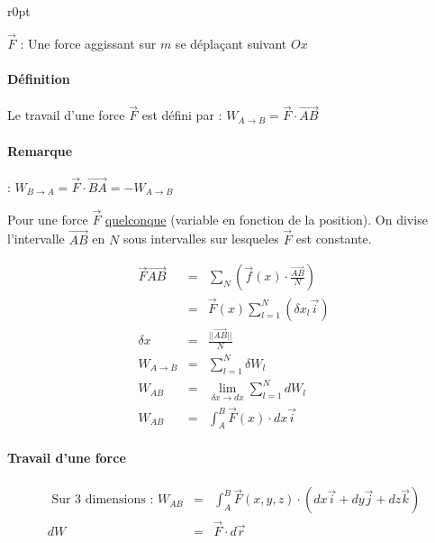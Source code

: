 \begin{wrapfigure}[6]{r}{0pt}
\end{wrapfigure}

$\vec{F}$ : Une force aggissant sur $m$ se déplaçant suivant $Ox$

\paragraph{Définition} Le travail d'une force $\vec{F}$ est défini par : $W_{A \rightarrow B} = \vec{F}\cdot\overrightarrow{AB}$
\paragraph{Remarque} : $W_{B \rightarrow A} = \vec{F}\cdot\overrightarrow{BA} = -W_{A \rightarrow B} $

Pour une force $\vec{F}$ \ul{quelconque} (variable en fonction de la position). On divise l'intervalle $\vec{AB}$ en $N$ sous intervalles sur lesqueles $\vec{F}$ est constante.

\[
	\begin{array}{rcl}
		\vec{F}\overrightarrow{AB} &=& \sum_N(\vec{f}(x) \cdot \frac{\overrightarrow{AB}}{N}) \\
								   &=& \vec{F}(x) \sum_{l=1}^{N}(\delta x_l \vec{i}) \\
		\delta x &=& \frac{||\overrightarrow{AB}||}{N} \\
		W_{A \rightarrow B} &=& \sum_{l=1}^N \delta W_l \\
		W_{AB} &=& \lim_{\delta x \to dx} \sum_{l=1}^N dW_l \\
		W_{AB} &=& \int_A^B \vec{F}(x)\cdot dx\vec{i}
\end{array}\]

\paragraph{Travail d'une force}

\[\begin{array}{rcl}
		\text{ Sur 3 dimensions : }	W_{AB} &=& \int_A^B\vec{F}(x, y, z) \cdot (dx\vec{i}+dy\vec{j}+dz\vec{k}) \\
		dW &=& \vec{F}\cdot d\vec{r}
\end{array}\]

